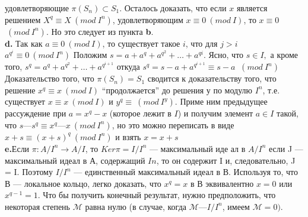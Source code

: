\documentclass{mai_book}
\begin{document}
удовлетворяющие $\pi(S_n) \subset S_1$. Осталось доказать, что если $x$ является
решением $X^{q} \equiv X ~(mod~ I^{n})$, удовлетворяющим $x \equiv 0 ~(mod~ I)$, то $x \equiv 0$
$~(mod~ I^{n})$. Но это следует из пункта \textbf{b}.\\
\hspace*{15pt}\textbf{d.} Так как $a \equiv 0 ~(mod~ I)$, то существует такое $i$, что для $j > i$\linebreak
$a^{q^{i}} \equiv0 ~(mod~ I^{n})$ Положим $s = a + a^{q} + a^{q^{2}} +\ldots+ a^{q{i}}$. Ясно, что $s \in I,$\linebreak
а кроме того, $s^{q} = a^{q}+ a^{q^{2}} +\ldots+ a^{q^{i+1}}$ откуда $s^{q} = s - a + a^{q^{i+1}} \equiv s - a$\linebreak
$~(mod~ I^{n})$\\
\hspace*{15pt}Доказательство того, что $\pi(S_n) = S_1$ сводится к доказательству
того, что решение $x^{q} \equiv x ~(mod~ I)$ “продолжается” до решения у по
модулю $I^{n}$, т.е. существует $x \equiv x ~(mod~ I)$ и $y^{q} \equiv ~(mod~ I^{y} )$. Приме­
ним предыдущее рассуждение при $a = x^{q} - x$ (которое лежит в $I$) и
получим элемент $a \in I$ такой, что $s — s^{q} \equiv x^{q} — x ~(mod~ I^{n})$, но это
можно переписать в виде $x + s \equiv (x + s)^{q} ~(mod~ I^{n})$ и взять $x = x + s$\\
\hspace*{15pt}\textbf{e.}Если $\pi : A/I^{n} \rightarrow A/I$, то $Ker\pi = I/I^{n}$ --- максимальный иде­
ал в $A/I^{n}$ если J — максимальный идеал в А, содержащий $I{n}$, то он
содержит I и, следовательно, J = I. Поэтому $I/I^{n}$ --- единственный
максимальный идеал в В. Используя то, что В — локальное кольцо,
легко доказать, что $x^{q} = x$ в В эквивалентно $x = 0$ или $x^{q-1} = 1$. Что­
бы получить конечный результат, нужно предположить, что некоторая
степень $\mathcal{M}$ равна нулю (в случае, когда $\mathcal{M} — I/I^{n}$, имеем $\mathcal{M} = 0)$.
\newpage
\end{document}
